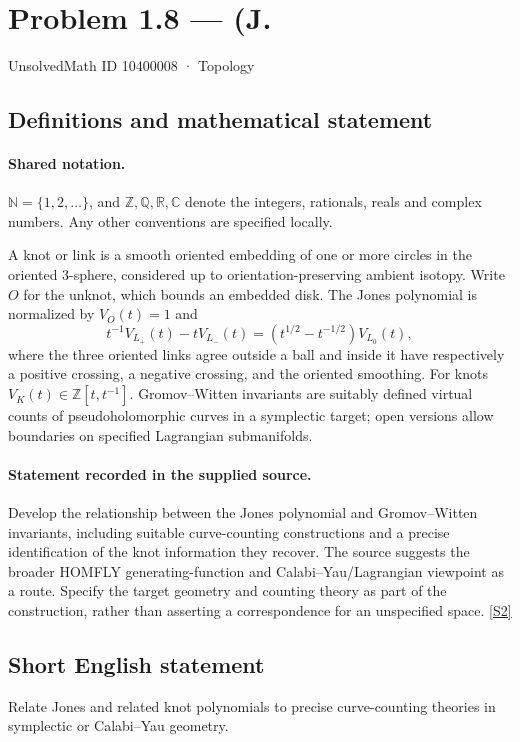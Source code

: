 \documentclass[11pt]{article}
\newcommand{\sref}[2]{\hyperlink{source:#1:#2}{[S#2]}}
\begin{document}
\setcounter{section}{10400007}
\section{Problem 1.8 — (J.}\label{10400008}
{\small\sffamily UnsolvedMath ID 10400008 · Topology}
\subsection{Definitions and mathematical statement}

\paragraph{Shared notation.}$\mathbb N=\{1,2,\ldots\}$, and $\mathbb Z,\mathbb Q,\mathbb R,\mathbb C$ denote the integers, rationals, reals and complex numbers. Any other conventions are specified locally.


A knot or link is a smooth oriented embedding of one or more circles in the oriented $3$-sphere, considered up to orientation-preserving ambient isotopy. Write $O$ for the unknot, which bounds an embedded disk. The Jones polynomial is normalized by $V_O(t)=1$ and
\[t^{-1}V_{L_+}(t)-tV_{L_-}(t)=(t^{1/2}-t^{-1/2})V_{L_0}(t),\]
where the three oriented links agree outside a ball and inside it have respectively a positive crossing, a negative crossing, and the oriented smoothing. For knots $V_K(t)\in\mathbb Z[t,t^{-1}]$. Gromov--Witten invariants are suitably defined virtual counts of pseudoholomorphic curves in a symplectic target; open versions allow boundaries on specified Lagrangian submanifolds.
\paragraph{Statement recorded in the supplied source.}
Develop the relationship between the Jones polynomial and Gromov--Witten invariants, including suitable curve-counting constructions and a precise identification of the knot information they recover. The source suggests the broader HOMFLY generating-function and Calabi--Yau/Lagrangian viewpoint as a route. Specify the target geometry and counting theory as part of the construction, rather than asserting a correspondence for an unspecified space. \sref{10400008}{2}
\subsection{Short English statement}
Relate Jones and related knot polynomials to precise curve-counting theories in symplectic or Calabi--Yau geometry.
\end{document}
